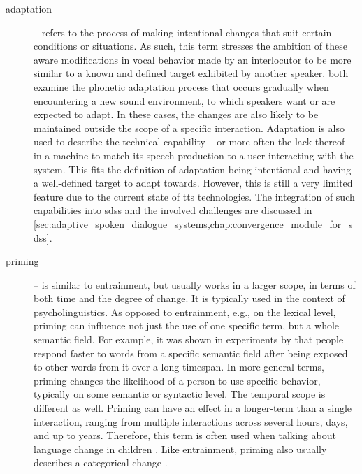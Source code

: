 \begin{description}
	\item[adaptation] -- refers to the process of making intentional changes that suit certain conditions or situations.
	As such, this term stresses the ambition of these aware modifications in vocal behavior made by an interlocutor to be more similar to a known and defined target exhibited by another speaker.
	\citet{Kang2010emergence, Hwang2015phonetic} both examine the phonetic adaptation process that occurs gradually when encountering a new sound environment, to which speakers want or are expected to adapt.
	In these cases, the changes are also likely to be maintained outside the scope of a specific interaction.
	Adaptation is also used to describe the technical capability -- or more often the lack thereof -- in a machine to match its speech production to a user interacting with the system.
	This fits the definition of adaptation being intentional and having a well-defined target to adapt towards.
	However, this is still a very limited feature due to the current state of \ac{tts} technologies.
	The integration of such capabilities into \acp{sds} and the involved challenges are discussed in \cref{sec:adaptive_spoken_dialogue_systems,chap:convergence_module_for_sdss}.
	
	\item[priming] -- is similar to entrainment, but usually works in a larger scope, in terms of both time and the degree of change.
	It is typically used in the context of psycholinguistics.
	As opposed to entrainment, e.g., on the lexical level, priming can influence not just the use of one specific term, but a whole semantic field.
	For example, it was shown in experiments by \citet{Meyer1971facilitation, Schvaneveldt1973retrieval} that people respond faster to words from a specific semantic field after being exposed to other words from it over a long timespan.
	In more general terms, priming changes the likelihood of a person to use specific behavior, typically on some semantic or syntactic level.
	The temporal scope is different as well.
	Priming can have an effect in a longer-term than a single interaction, ranging from multiple interactions across several hours, days, and up to years.
	Therefore, this term is often used when talking about language change in children \citep[see, e.g., ][]{Huttenlocher2004syntactic, Wansink2012would}.
	Like entrainment, priming also usually describes a categorical change \citep[cf.][]{Reitter2006computational, Pace2013concept}.
	

\end{description}
